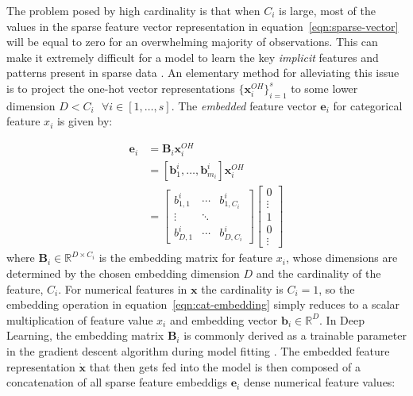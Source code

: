 \documentclass{mldsmsc}
\begin{document}
The problem posed by high cardinality is that when $C_i$ is large, most of the values
in the sparse feature vector representation in equation~\ref{eqn:sparse-vector}
will be equal to zero for an overwhelming majority of observations. This can make it extremely difficult
for a model to learn the key \emph{implicit} features and patterns present in sparse
data \citep{RefWorks:gu2021ad}. An elementary method for alleviating this issue is to project
the one-hot vector representations $\{ \mathbf{x}_i^{OH}\}_{i=1}^{s}$ to some lower dimension
$D < C_i \text{ } \forall i \in [1, \ldots, s]$. The \emph{embedded} feature vector
$\mathbf{e}_i$ for categorical feature $x_i$ is given by:

\begin{equation}
\label{eqn:cat-embedding}
\begin{split}
\mathbf{e}_i &= \mathbf{B}_i \mathbf{x}_i^{OH}\\
&= \left[\mathbf{b}_{1}^{i}, \ldots, \mathbf{b}_{m_i}^{i} \right] \mathbf{x}_i^{OH} \\
&= \begin{bmatrix}
b_{1,1}^i & \cdots & b_{1 ,C_i}^i\\
\vdots & \ddots & \\
b_{D, 1}^i & \cdots & b_{D, C_i}^i
\end{bmatrix}
\begin{bmatrix}
    0 \\
    \vdots \\
    1 \\
    0\\
    \vdots
\end{bmatrix}
\end{split}
\end{equation}
where $\mathbf{B}_i \in \mathbb{R}^{D \times C_i}$ is the embedding matrix for feature $x_i$, whose dimensions are determined
by the chosen embedding dimension $D$ and the cardinality of the feature, $C_i$. For numerical features
in $\mathbf{x}$ the cardinality is $C_i = 1$, so the embedding operation in equation~\ref{eqn:cat-embedding}
simply reduces to a scalar multiplication of feature value $x_i$ and embedding vector $\mathbf{b}_i \in \mathbb{R}^{D}$.
In Deep Learning, the embedding matrix $\mathbf{B}_i$ is commonly derived as a trainable parameter in the gradient descent
algorithm during model fitting \citep{RefWorks:hancock2020survey}. The embedded feature representation
$\dot{\mathbf{x}}$ that then gets fed into the model is 
then composed of a concatenation of all sparse feature embeddigs $\mathbf{e}_i$ dense 
numerical feature values:
\end{document}
